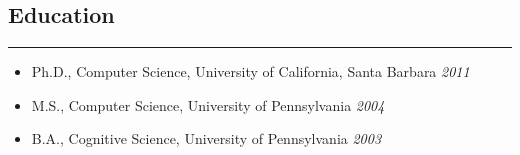 \subsection*{Education}
\hrule
\vspace{0.2cm}

\begin{itemize}
    \item Ph.D., Computer Science, University of California, Santa Barbara
    \hfill {\it 2011}
    \item M.S., Computer Science,  University of Pennsylvania \hfill {\it 2004}
    \item B.A., Cognitive Science, University of Pennsylvania \hfill {\it 2003}
\end{itemize}
